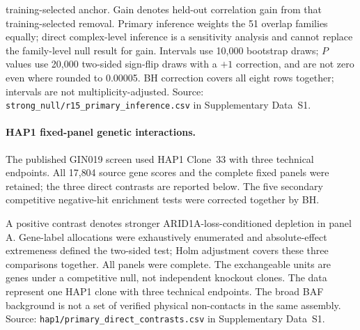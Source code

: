 \documentclass[11pt,letterpaper]{article}
\begin{document}
\begin{table}[htbp]
\begin{minipage}{\textwidth}
training-selected anchor. Gain denotes held-out correlation gain from that
training-selected removal. Primary inference weights the 51 overlap families
equally; direct complex-level inference is a sensitivity analysis and cannot
replace the family-level null result for gain. Intervals use 10{,}000 bootstrap
draws; $P$ values use 20{,}000 two-sided sign-flip draws with a $+1$ correction,
and are not zero even where rounded to 0.00005. BH correction covers all
eight rows together; intervals are not multiplicity-adjusted. Source:
\texttt{strong\_null/r15\_primary\_inference.csv} in Supplementary Data~S1.
\end{minipage}
\end{table}

\paragraph{HAP1 fixed-panel genetic interactions.}
The published GIN019 screen used HAP1 Clone~33 with three technical endpoints.
All 17{,}804 source gene scores and the complete fixed panels were retained;
the three direct contrasts are reported below. The five secondary competitive
negative-hit enrichment tests were corrected together by BH.

\begin{table}[htbp]
\centering
\small
\caption{\textbf{Complete fixed-panel HAP1 genetic-interaction contrasts.}}
\label{tab:sr_r15_hap1}
\par\smallskip
\begin{minipage}{\textwidth}
\footnotesize
A positive contrast denotes stronger ARID1A-loss-conditioned depletion
in panel A. Gene-label allocations were exhaustively enumerated and
absolute-effect extremeness defined the two-sided test; Holm adjustment
covers these three comparisons together. All panels were complete. The
exchangeable units are genes under a competitive null, not independent
knockout clones. The data represent one HAP1 clone with three technical
endpoints. The broad BAF background is not a set of verified physical
non-contacts in the same assembly. Source:
\texttt{hap1/primary\_direct\_contrasts.csv} in Supplementary Data~S1.
\end{minipage}
\end{table}
\end{document}
